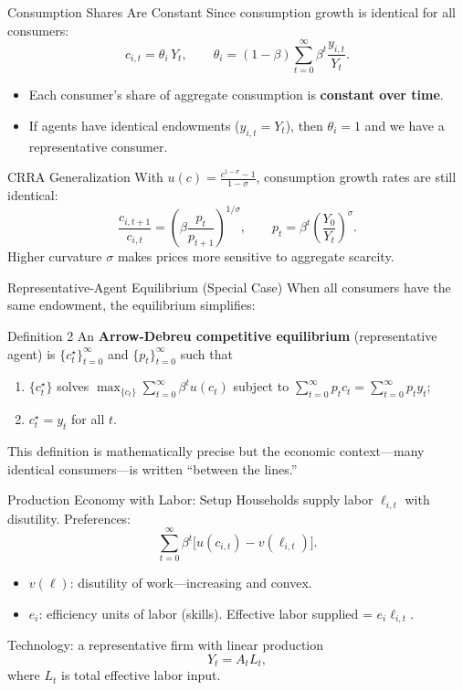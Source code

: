 \documentclass[aspectratio=169,10pt]{beamer}
\begin{document}
\begin{frame}{Consumption Shares Are Constant}
Since consumption growth is identical for all consumers:
\[
c_{i,t} = \theta_i \, Y_t,
\qquad
\theta_i = (1-\beta)\sum_{t=0}^{\infty}\beta^t \frac{y_{i,t}}{Y_t}.
\]

\begin{itemize}
  \item Each consumer's share of aggregate consumption is \textbf{constant over time}.
  \item If agents have identical endowments ($y_{i,t}=Y_t$), then $\theta_i=1$ and we have a representative consumer.
\end{itemize}

\begin{block}{CRRA Generalization}
With $u(c)=\frac{c^{1-\sigma}-1}{1-\sigma}$, consumption growth rates are still identical:
\[
\frac{c_{i,t+1}}{c_{i,t}} = \left(\beta\frac{p_t}{p_{t+1}}\right)^{1/\sigma}, \qquad p_t = \beta^t\left(\frac{Y_0}{Y_t}\right)^{\sigma}.
\]
Higher curvature $\sigma$ makes prices more sensitive to aggregate scarcity.
\end{block}
\end{frame}

\begin{frame}{Representative-Agent Equilibrium (Special Case)}
When all consumers have the same endowment, the equilibrium simplifies:

\begin{block}{Definition 2}
An \textbf{Arrow-Debreu competitive equilibrium} (representative agent) is $\{c_t^\star\}_{t=0}^\infty$ and $\{p_t\}_{t=0}^\infty$ such that
\begin{enumerate}
  \item $\{c_t^\star\}$ solves $\displaystyle\max_{\{c_t\}} \sum_{t=0}^{\infty}\beta^t u(c_t)$ subject to $\displaystyle\sum_{t=0}^{\infty} p_t c_t = \sum_{t=0}^{\infty} p_t y_t$;
  \item $c_t^\star = y_t$ for all $t$.
\end{enumerate}
\end{block}

\medskip
This definition is mathematically precise but the economic context---many identical consumers---is written ``between the lines.''
\end{frame}


\begin{frame}{Production Economy with Labor: Setup}
\hypertarget{m-a12}{}
Households supply labor $\ell_{i,t}$ with disutility. Preferences:
\[
\sum_{t=0}^{\infty}\beta^t\big[u(c_{i,t})-v(\ell_{i,t})\big].
\tag{5.4}
\]
\begin{itemize}
  \item $v(\ell)$: disutility of work---increasing and convex.
  \item $e_i$: efficiency units of labor (skills). Effective labor supplied = $e_i\ell_{i,t}$.
\end{itemize}

\medskip
Technology: a representative firm with linear production
\[
Y_t=A_t L_t,
\tag{5.5}
\]
where $L_t$ is total effective labor input.
\end{frame}
\end{document}
